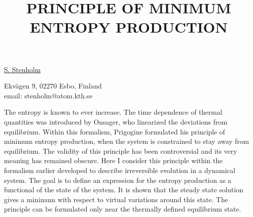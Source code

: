 \title{PRINCIPLE OF MINIMUM ENTROPY PRODUCTION}

\underline{S. Stenholm}


Ekv\"{a}gen 9,
02270 Esbo,
Finland\\
email: stenholm@atom.kth.se

The entropy is known to ever increase. The time dependence of thermal quantities was introduced by Onsager, who linearized the deviations from equilibrium. Within this formalism, Prigogine formulated his principle of minimum entropy production, when the system is constrained to stay away from equilibrium. The validity of this principle has been controversial and its very meaning has remained obscure. Here I consider this principle within the formalism earlier developed to describe irreversible evolution in a dynamical system. The goal is to define an expression for the entropy production as a functional of the state of the system. It is shown that the steady state solution gives a minimum with respect to virtual variations around this state. The principle can be formulated only near the thermally defined equilibrium state.

\vspace{\baselineskip}